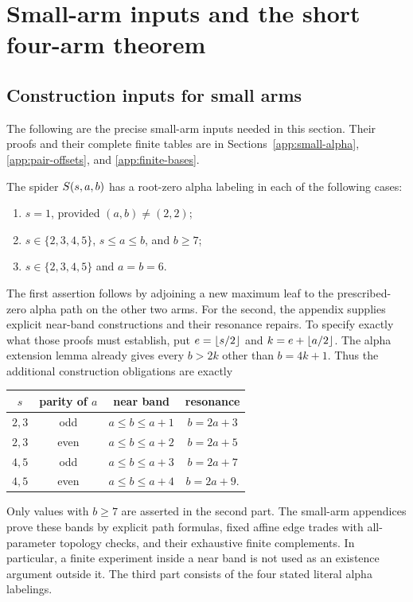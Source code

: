 \section{Small-arm inputs and the short four-arm theorem}\label{shared:short-cores}
\subsection{Construction inputs for small arms}
\label{seven:small-inputs}

The following are the precise small-arm inputs needed in this section.
Their proofs and their complete finite tables are in
Sections~\ref{app:small-alpha}, \ref{app:pair-offsets}, and
\ref{app:finite-bases}.

\begin{proposition}\label{seven:small-alpha}
The spider $S\!\left(s,a,b\right)$ has a root-zero alpha labeling in each of the
following cases:
\begin{enumerate}
\item $s=1$, provided $(a,b)\ne(2,2)$;
\item $s\in\{2,3,4,5\}$, $s\le a\le b$, and $b\ge7$;
\item $s\in\{2,3,4,5\}$ and $a=b=6$.
\end{enumerate}
\end{proposition}

The first assertion follows by adjoining a new maximum leaf to the
prescribed-zero alpha path on the other two arms.  For the second,
the appendix supplies explicit near-band constructions and their
resonance repairs.  To specify exactly what those proofs must establish,
put $e=\left\lfloor s/2\right\rfloor$ and $k=e+\left\lfloor a/2\right\rfloor$.  The alpha extension lemma
already gives every $b>2k$ other than $b=4k+1$.  Thus the additional
construction obligations are exactly
\begin{center}
\begin{tabular}{c|c|c|c}
$s$ & parity of $a$ & near band & resonance\\ \hline
$2,3$ & odd & $a\le b\le a+1$ & $b=2a+3$\\
$2,3$ & even & $a\le b\le a+2$ & $b=2a+5$\\
$4,5$ & odd & $a\le b\le a+3$ & $b=2a+7$\\
$4,5$ & even & $a\le b\le a+4$ & $b=2a+9$.
\end{tabular}
\end{center}
Only values with $b\ge7$ are asserted in the second part.  The
small-arm appendices prove these bands by explicit path formulas,
fixed affine edge trades with all-parameter topology checks, and their
exhaustive finite complements.  In particular, a finite experiment
inside a near band is not used as an existence argument outside it.
The third part consists of the four stated literal alpha labelings.


